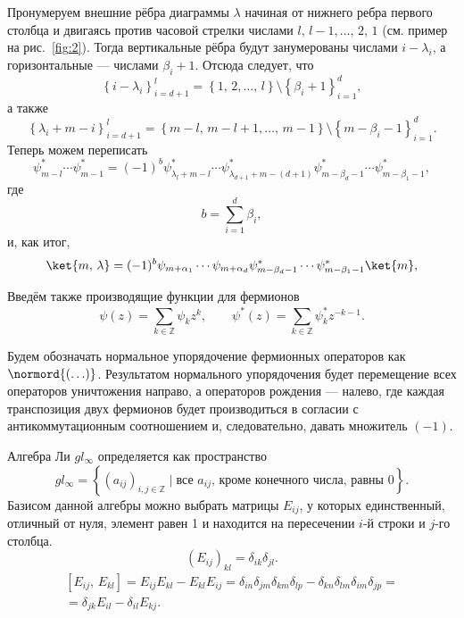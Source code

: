 \documentclass[a5paper,twoside]{article}
\begin{document}
Пронумеруем внешние рёбра диаграммы $\lambda$  начиная от нижнего ребра первого столбца и двигаясь против часовой стрелки числами $l,\,l-1,\ldots,\,2,\,1$ (см. пример на рис.~\ref{fig:2}).
Тогда вертикальные рёбра будут занумерованы
числами $i-\lambda_i$, а горизонтальные --- числами
$\beta_i+1$. Отсюда следует, что
\begin{equation}\left\{ i-\lambda_i \right\}_{i=d+1}^{l}=
 \left\{ 1,\,2,\ldots,\,l\right\} \setminus
 \left\{ \beta_i +1 \right\} _{i=1}^{d},\end{equation}
а также
\begin{equation}
\left\{\lambda_i+m-i \right\}_{i=d+1}^{l}=
 \left\{ m-l,\,m-l+1,\ldots,\,m-1 \right\} \setminus
 \left\{ m-\beta_i -1 \right\} _{i=1}^{d}
.\end{equation} 
Теперь можем переписать
\begin{equation}
\psi^*_{m-l}\cdots \psi^*_{m-1}=
(-1)^b \psi^*_{\lambda_l+m-l}\cdots \psi^*_{\lambda_{d+1}+m-(d+1)}
\psi_{m-\beta_d-1}^*\cdots \psi_{m-\beta_1-1}^*
,\end{equation} 
где
\begin{equation}
	b= \sum_{i=1}^{d} \beta_i
,\end{equation} 
и, как итог,
\begin{equation}
	\ket{m,\,\lambda}=(-1)^{b}
	\psi_{m+\alpha_{1}}\cdots
	\psi_{m+\alpha_d}\psi^*_{m-\beta_d -1} \cdots \psi_{m-\beta_{1}-1}^* \ket{m}
,\end{equation} 


Введём также производящие функции для фермионов
\begin{equation}
\psi(z)=\sum _{k\in \mathbb{Z}}^{} \psi_k z^k,\qquad
\psi^* (z)=\sum_{k \in \mathbb{Z}}^{} \psi^*_k z^{-k-1}
.\end{equation} 

Будем обозначать нормальное упорядочение фермионных
операторов как $\normord{\left( \ldots \right) }$.
Результатом нормального упорядочения будет перемещение
всех операторов уничтожения направо, а операторов
рождения --- налево, где каждая транспозиция двух
фермионов будет производиться в согласии с антикоммутационным
соотношением и, следовательно, давать множитель $(-1)$. 

Алгебра Ли $gl_\infty$ определяется как пространство
\begin{equation}
	gl_\infty= \left\{ \left( a_{ij} \right) _{i,j \in \mathbb{Z}}\mid\text{все }a_{ij}\text{, кроме конечного
	числа, равны 0} \right\} 
.\end{equation} 
Базисом данной алгебры можно выбрать матрицы  $E_{ij}$,
у которых единственный, отличный от нуля, элемент равен 1 и находится
на пересечении $i$-й строки и $j$-го столбца.
 \begin{equation}
	(E_{ij})_{kl}=\delta_{ik}\delta_{jl}
.\end{equation} 
\begin{multline}
\left[ E_{ij},\,E_{kl} \right] =
E_{ij}E_{kl}-E_{kl}E_{ij}=
\delta_{in}\delta_{jm}\delta_{km}\delta_{lp}-
\delta_{kn}\delta_{lm}\delta_{im}\delta_{jp}=\\=
\delta_{jk}E_{il}-\delta_{il}E_{kj}
.\end{multline} 
\end{document}
